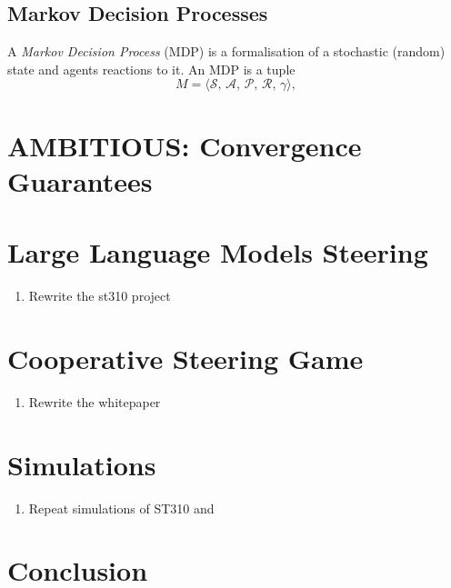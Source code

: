 \documentclass[a4paper,oneside,11pt]{report}
\begin{document}
\section{Markov Decision Processes}
\label{sec:mdp}

A \textit{Markov Decision Process} (MDP) is a formalisation of a stochastic (random) state and agents reactions to it. An MDP is a tuple 
  \begin{equation}
    \label{eq:mdp-tuple}
    M = \langle \mathcal{S},\, \mathcal{A},\, \mathcal{P},\, \mathcal{R},\, \gamma \rangle,
  \end{equation}

\chapter{AMBITIOUS: Convergence Guarantees}

\chapter{Large Language Models Steering}
\begin{enumerate}
    \item Rewrite the st310 project
\end{enumerate}
\chapter{Cooperative Steering Game}
\begin{enumerate}
    \item Rewrite the whitepaper
\end{enumerate}
\chapter{Simulations}
\begin{enumerate}
    \item Repeat simulations of ST310 and \cite{kim2021policygradientalgorithmlearning}
\end{enumerate}

\chapter{Conclusion}



\end{document}
